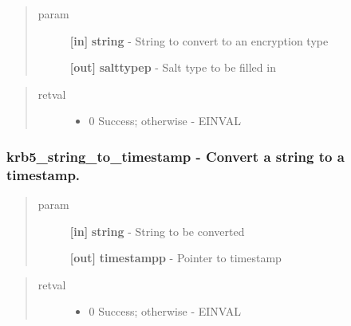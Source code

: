 \documentclass[letterpaper,10pt,english]{sphinxmanual}
\begin{document}
\begin{quote}\begin{description}
\item[{param}] \leavevmode
\textbf{{[}in{]}} \textbf{string} - String to convert to an encryption type

\textbf{{[}out{]}} \textbf{salttypep} - Salt type to be filled in

\end{description}\end{quote}
\begin{quote}\begin{description}
\item[{retval}] \leavevmode\begin{itemize}
\item {} 
0   Success; otherwise - EINVAL

\end{itemize}

\end{description}\end{quote}


\subsubsection{krb5\_string\_to\_timestamp -  Convert a string to a timestamp.}
\label{appdev/refs/api/krb5_string_to_timestamp::doc}\label{appdev/refs/api/krb5_string_to_timestamp:krb5-string-to-timestamp-convert-a-string-to-a-timestamp}

\begin{fulllineitems}
\label{appdev/refs/api/krb5_string_to_timestamp:krb5_string_to_timestamp}
\end{fulllineitems}

\begin{quote}\begin{description}
\item[{param}] \leavevmode
\textbf{{[}in{]}} \textbf{string} - String to be converted

\textbf{{[}out{]}} \textbf{timestampp} - Pointer to timestamp

\end{description}\end{quote}
\begin{quote}\begin{description}
\item[{retval}] \leavevmode\begin{itemize}
\item {} 
0   Success; otherwise - EINVAL

\end{itemize}

\end{description}\end{quote}
\end{document}
